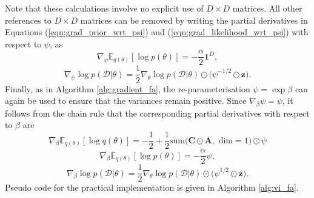 \documentclass[msc,deptreport.inf]{infthesis} %
\newcommand{\matr}[1]{\mathbf{#1}}
\newcommand{\E}{\mathbb E}
\begin{document}
Note that these calculations involve no explicit use of $D \times D$ matrices. All other references to $D \times D$ matrices can be removed by writing the partial derivatives in Equations (\ref{eqn:grad_prior_wrt_psi}) and (\ref{eqn:grad_likelihood_wrt_psi}) with respect to $\psi$, as
\begin{equation}
	\nabla_\psi \E_{q(\theta)} [\log p(\theta)] = -\frac{\alpha}{2} \matr{1}^D,
\end{equation}
\begin{equation}
	\nabla_{\psi} \log p(\mathcal{D} | \theta) = \frac{1}{2} \nabla_\theta \log p(\mathcal{D} | \theta) \odot \big(\psi^{-1/2} \odot \matr{z} \big).
\end{equation}
Finally, as in Algorithm \ref{alg:gradient_fa}, the re-parameterisation $\psi = \exp \beta$ can again be used to ensure that the variances remain positive. Since $\nabla_\beta \psi = \psi$, it follows from the chain rule that the corresponding partial derivatives with respect to $\beta$ are 
\begin{equation}
	\nabla_\beta \E_{q(\theta)} [\log q(\theta)] = -\frac{1}{2} + \frac{1}{2} \text{sum}\big(\matr{C} \odot \matr{A}, \text{ dim} = 1\big) \odot \psi 
\end{equation}
\begin{equation}
	\nabla_\beta \E_{q(\theta)} [\log p(\theta)] = -\frac{\alpha}{2} \psi,
\end{equation}
\begin{equation}
	\nabla_{\beta} \log p(\mathcal{D} | \theta) = \frac{1}{2} \nabla_\theta \log p(\mathcal{D} | \theta) \odot \big(\psi^{1/2} \odot \matr{z}\big).
\end{equation}
Pseudo code for the practical implementation is given in Algorithm \ref{alg:vi_fa}.
\end{document}
